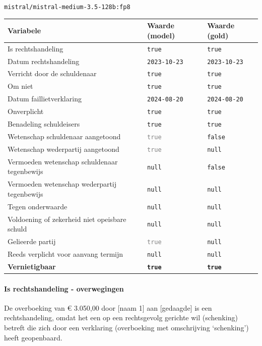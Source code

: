 \documentclass[
  dutch,
  a4paper,
]{article}
\begin{document}
\texttt{mistral/mistral-medium-3.5-128b:fp8}

\begin{center}
\small
\begin{tabular}{@{}p{7.4cm}p{2.6cm}p{2.6cm}@{}}
\toprule
Variabele & Waarde (model) & Waarde (gold) \\
\midrule
Is rechtshandeling & \texttt{true} & \texttt{true} \\
Datum rechtshandeling & \texttt{2023-10-23} & \texttt{2023-10-23} \\
Verricht door de schuldenaar & \texttt{true} & \texttt{true} \\
Om niet & \texttt{true} & \texttt{true} \\
Datum faillietverklaring & \texttt{2024-08-20} & \texttt{2024-08-20} \\
Onverplicht & \texttt{true} & \texttt{true} \\
Benadeling schuldeisers & \texttt{true} & \texttt{true} \\
Wetenschap schuldenaar aangetoond & \textcolor{gray}{\texttt{true}} & \texttt{false} \\
Wetenschap wederpartij aangetoond & \textcolor{gray}{\texttt{true}} & \texttt{null} \\
Vermoeden wetenschap schuldenaar tegenbewijs & \texttt{null} & \texttt{false} \\
Vermoeden wetenschap wederpartij tegenbewijs & \texttt{null} & \texttt{null} \\
Tegen onderwaarde & \texttt{null} & \texttt{null} \\
Voldoening of zekerheid niet opeisbare schuld & \texttt{null} & \texttt{null} \\
Gelieerde partij & \textcolor{gray}{\texttt{true}} & \texttt{null} \\
Reeds verplicht voor aanvang termijn & \texttt{null} & \texttt{null} \\
\textbf{Vernietigbaar} & \textbf{\texttt{true}} & \textbf{\texttt{true}} \\
\bottomrule
\end{tabular}
\end{center}

\paragraph{Is rechtshandeling - overwegingen}\label{is-rechtshandeling---overwegingen-33}

De overboeking van € 3.050,00 door {[}naam 1{]} aan {[}gedaagde{]} is een rechtshandeling, omdat het een op een rechtsgevolg gerichte wil (schenking) betreft die zich door een verklaring (overboeking met omschrijving `schenking') heeft geopenbaard.
\end{document}
